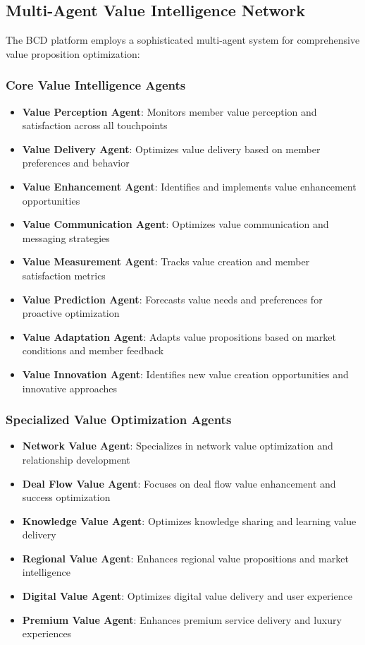 \subsection{Multi-Agent Value Intelligence Network}

The BCD platform employs a sophisticated multi-agent system for comprehensive value proposition optimization:

\subsubsection{Core Value Intelligence Agents}

\begin{itemize}
    \item \textbf{Value Perception Agent}: Monitors member value perception and satisfaction across all touchpoints
    \item \textbf{Value Delivery Agent}: Optimizes value delivery based on member preferences and behavior
    \item \textbf{Value Enhancement Agent}: Identifies and implements value enhancement opportunities
    \item \textbf{Value Communication Agent}: Optimizes value communication and messaging strategies
    \item \textbf{Value Measurement Agent}: Tracks value creation and member satisfaction metrics
    \item \textbf{Value Prediction Agent}: Forecasts value needs and preferences for proactive optimization
    \item \textbf{Value Adaptation Agent}: Adapts value propositions based on market conditions and member feedback
    \item \textbf{Value Innovation Agent}: Identifies new value creation opportunities and innovative approaches
\end{itemize}

\subsubsection{Specialized Value Optimization Agents}

\begin{itemize}
    \item \textbf{Network Value Agent}: Specializes in network value optimization and relationship development
    \item \textbf{Deal Flow Value Agent}: Focuses on deal flow value enhancement and success optimization
    \item \textbf{Knowledge Value Agent}: Optimizes knowledge sharing and learning value delivery
    \item \textbf{Regional Value Agent}: Enhances regional value propositions and market intelligence
    \item \textbf{Digital Value Agent}: Optimizes digital value delivery and user experience
    \item \textbf{Premium Value Agent}: Enhances premium service delivery and luxury experiences
\end{itemize}


